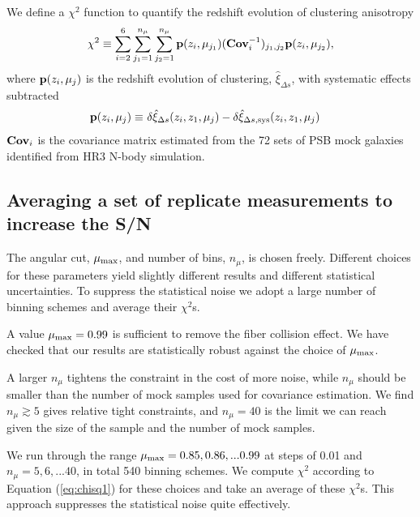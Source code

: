 \documentclass[iop]{emulateapj}
\begin{document}
We define a $\chi^2$ function to quantify the redshift evolution of clustering anisotropy
\begin{equation}\label{eq:chisq1}
\chi^2\equiv \sum_{i=2}^{6} \sum_{j_1=1}^{n_{\mu}} \sum_{j_2=1}^{n_{\mu}} {\bf p}(z_i,\mu_{j_1}) ({\bf Cov}_{i}^{-1})_{j_1,j_2}  {\bf p}(z_i,\mu_{j_2}),
\end{equation}
where ${\bf p}(z_i,\mu_{j})$ is the redshift evolution of clustering, 
$\hat \xi_{\Delta s}$, with systematic effects subtracted
\begin{eqnarray}\label{eq:bfp}
 {\bf p}(z_i,\mu_{j}) \equiv&\ \delta \hat\xi_{\Delta s}(z_i,z_1,\mu_j) - \delta \hat\xi_{\Delta s, \rm sys}(z_i,z_1,\mu_j)
\end{eqnarray}
${\bf Cov}_i$ is the covariance matrix estimated from the 72 sets of PSB mock galaxies identified from HR3 N-body simulation.

\subsection{Averaging a set of replicate measurements to increase the S/N}\label{sec:binningscheme}

The angular cut, $\mu_{\rm max}$, and number of bins, $n_\mu$, is chosen freely.
Different choices for these parameters yield slightly different results and different statistical uncertainties.
To suppress the statistical noise we adopt a large number of binning schemes and average their $\chi^2$s.

A value $\mu_{\rm max} = 0.99$ is sufficient to remove the fiber collision effect.
We have checked that our results are statistically robust against the choice of $\mu_{\rm max}$.

A larger $n_\mu$ tightens the constraint 
in the cost of more noise, 
while $n_\mu$ should be smaller than the number of mock samples used for covariance estimation.
We find $n_\mu \gtrsim 5$ gives relative tight constraints, 
and $n_\mu = 40$ is the limit we can reach given the size of the sample and the number of mock samples.

We run through the range $\mu_{\rm max} = 0.85, 0.86, ... 0.99$ at steps of 0.01 and $n_\mu = 5, 6, ... 40$, in total 540 binning schemes.
We compute $\chi^2$ according to Equation (\ref{eq:chisq1}) for these choices and take an average of these $\chi^2$s.
This approach suppresses the statistical noise quite effectively. %
\end{document}
